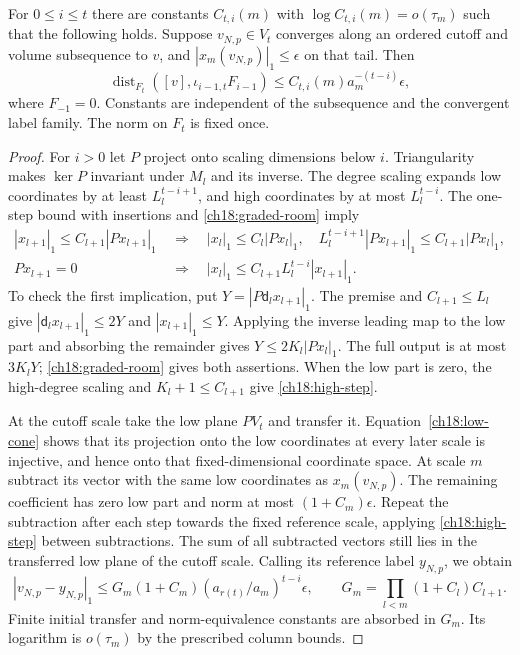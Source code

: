 \begin{proposition}
\label{ch18:graded-estimate}
For $0\le i\le t$ there are constants $C_{t,i}(m)$ with
$\log C_{t,i}(m)=o(\tau_m)$ such that the following holds.
Suppose $v_{N,p}\in V_t$ converges along an ordered cutoff and volume
subsequence to $v$, and $|x_m(v_{N,p})|_1\le\epsilon$ on that tail.
Then
\begin{equation}
 \operatorname{dist}_{F_t}([v],\iota_{i-1,t}F_{i-1})
       \le C_{t,i}(m)a_m^{-(t-i)}\epsilon,
 \label{ch18:graded-distance}
\end{equation}
where $F_{-1}=0$. Constants are independent of the subsequence and the
convergent label family. The norm on $F_t$ is fixed once.
\end{proposition}
\begin{proof}
For $i>0$ let $P$ project onto scaling dimensions below $i$.
Triangularity makes $\ker P$ invariant under $M_l$ and its inverse.
The degree scaling expands low coordinates by at least
$L_l^{t-i+1}$, and high coordinates by at most $L_l^{t-i}$.
The one-step bound with insertions and \eqref{ch18:graded-room} imply
\begin{align}
 |x_{l+1}|_1\le C_{l+1}|Px_{l+1}|_1
 &\ \Longrightarrow\quad
 |x_l|_1\le C_l|Px_l|_1,\quad
 L_l^{t-i+1}|Px_{l+1}|_1\le C_{l+1}|Px_l|_1,
 \label{ch18:low-cone}\\
 Px_{l+1}=0
 &\ \Longrightarrow\quad
 |x_l|_1\le C_{l+1}L_l^{t-i}|x_{l+1}|_1.
 \label{ch18:high-step}
\end{align}
To check the first implication, put $Y=|P\mathsf d_lx_{l+1}|_1$.
The premise and $C_{l+1}\le L_l$ give
$|\mathsf d_lx_{l+1}|_1\le2Y$ and $|x_{l+1}|_1\le Y$. Applying the inverse leading map
to the low part and absorbing the remainder gives
$Y\le2K_l|Px_l|_1$. The full output is at most $3K_lY$;
\eqref{ch18:graded-room} gives both assertions. When the low part
is zero, the high-degree scaling and $K_l+1\le C_{l+1}$ give
\eqref{ch18:high-step}.

At the cutoff scale take the low plane $PV_t$ and transfer it.
Equation~\eqref{ch18:low-cone} shows that its projection onto the low
coordinates at every later scale is injective, and hence onto that
fixed-dimensional coordinate space. At scale $m$ subtract its vector
with the same low coordinates as $x_m(v_{N,p})$. The remaining
coefficient has zero low part and norm at most $(1+C_m)\epsilon$.
Repeat the subtraction after each step towards the fixed reference
scale, applying \eqref{ch18:high-step} between subtractions. The sum of
all subtracted vectors still lies in the transferred low
plane of the cutoff scale. Calling its reference label $y_{N,p}$, we obtain
\[
 |v_{N,p}-y_{N,p}|_1\le
 G_m(1+C_m)(a_{r(t)}/a_m)^{t-i}\epsilon,
 \qquad G_m=\prod_{l<m}(1+C_l)C_{l+1}.
\]
Finite initial transfer and norm-equivalence constants are absorbed in
$G_m$. Its logarithm is $o(\tau_m)$ by the prescribed column bounds.


\end{proof}
